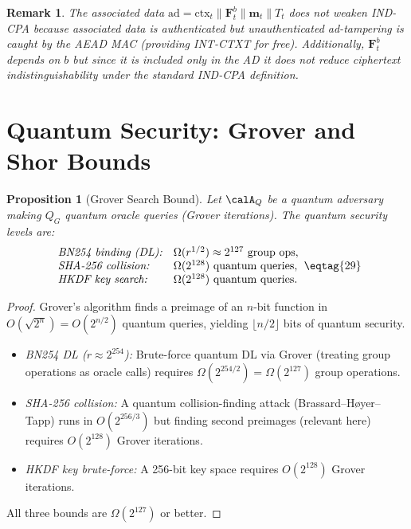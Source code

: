 \documentclass[11pt,letterpaper]{article}
\newtheorem{proposition}{Proposition}[section]
\newtheorem{remark}{Remark}[section]
\begin{document}
\begin{remark}
The associated data $\mathrm{ad} = \mathrm{ctx}_t \| \mathbf{F}^b_t \| \mathbf{m}_t \| T_t$
does not weaken IND-CPA because associated data is authenticated but unauthenticated
ad-tampering is caught by the AEAD MAC (providing INT-CTXT for free). Additionally,
$\mathbf{F}^b_t$ depends on $b$ but since it is included only in the AD it does
not reduce ciphertext indistinguishability under the standard IND-CPA definition.
\end{remark}

\section{Quantum Security: Grover and Shor Bounds}
\label{sec:quantum}

\begin{proposition}[Grover Search Bound]\label{prop:grover}
Let $\calA_Q$ be a quantum adversary making $Q_G$ quantum oracle queries
(Grover iterations). The quantum security levels are:
\[
  \begin{array}{ll}
    \textit{BN254 binding (DL):} & \Omega(r^{1/2}) \approx 2^{127} \text{ group ops}, \\
    \textit{SHA-256 collision:}  & \Omega(2^{128}) \text{ quantum queries}, \\
    \textit{HKDF key search:}   & \Omega(2^{128}) \text{ quantum queries}.
  \end{array} \eqtag{29}
\]
\end{proposition}

\begin{proof}
Grover's algorithm finds a preimage of an $n$-bit function in
$O(\sqrt{2^n}) = O(2^{n/2})$ quantum queries, yielding $\lfloor n/2 \rfloor$
bits of quantum security.
\begin{itemize}[noitemsep]
  \item \textit{BN254 DL ($r \approx 2^{254}$):}
        Brute-force quantum DL via Grover (treating group operations as oracle calls)
        requires $\Omega(2^{254/2}) = \Omega(2^{127})$ group operations.
  \item \textit{SHA-256 collision:}
        A quantum collision-finding attack (Brassard--H{\o}yer--Tapp)
        runs in $O(2^{256/3})$ but finding second preimages (relevant here)
        requires $O(2^{128})$ Grover iterations.
  \item \textit{HKDF key brute-force:}
        A 256-bit key space requires $O(2^{128})$ Grover iterations.
\end{itemize}
All three bounds are $\Omega(2^{127})$ or better.
\end{proof}
\end{document}
